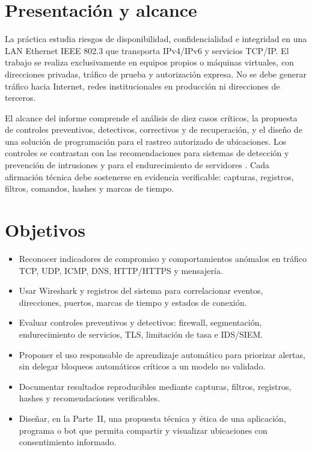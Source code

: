 \section{Presentación y alcance}

La práctica estudia riesgos de disponibilidad, confidencialidad e integridad en una LAN Ethernet IEEE 802.3 que transporta IPv4/IPv6 y servicios TCP/IP. El trabajo se realiza exclusivamente en equipos propios o máquinas virtuales, con direcciones privadas, tráfico de prueba y autorización expresa. No se debe generar tráfico hacia Internet, redes institucionales en producción ni direcciones de terceros.

El alcance del informe comprende el análisis de diez casos críticos, la propuesta de controles preventivos, detectivos, correctivos y de recuperación, y el diseño de una solución de programación para el rastreo autorizado de ubicaciones. Los controles se contrastan con las recomendaciones para sistemas de detección y prevención de intrusiones \parencite{nist80094} y para el endurecimiento de servidores \parencite{nist800123}. Cada afirmación técnica debe sostenerse en evidencia verificable: capturas, registros, filtros, comandos, hashes y marcas de tiempo.

\section{Objetivos}

\begin{itemize}[leftmargin=*, topsep=2pt, itemsep=2pt]
	\item Reconocer indicadores de compromiso y comportamientos anómalos en tráfico TCP, UDP, ICMP, DNS, HTTP/HTTPS y mensajería.
	\item Usar Wireshark y registros del sistema para correlacionar eventos, direcciones, puertos, marcas de tiempo y estados de conexión.
	\item Evaluar controles preventivos y detectivos: firewall, segmentación, endurecimiento de servicios, TLS, limitación de tasa e IDS/SIEM.
	\item Proponer el uso responsable de aprendizaje automático para priorizar alertas, sin delegar bloqueos automáticos críticos a un modelo no validado.
	\item Documentar resultados reproducibles mediante capturas, filtros, registros, hashes y recomendaciones verificables.
	\item Diseñar, en la Parte~II, una propuesta técnica y ética de una aplicación, programa o bot que permita compartir y visualizar ubicaciones con consentimiento informado.
\end{itemize}

